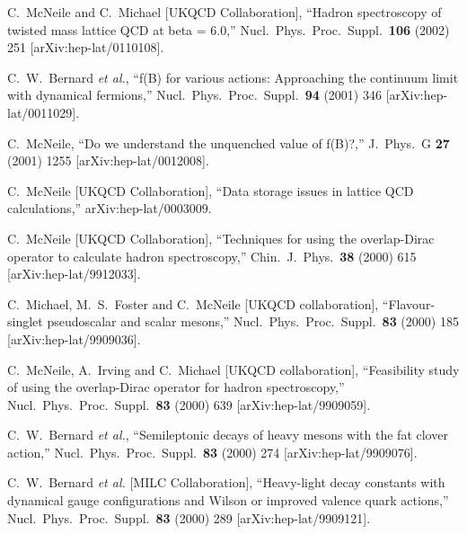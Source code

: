 \begin{thebibliography}{130}
C.~McNeile and C.~Michael  [UKQCD Collaboration],
``Hadron spectroscopy of twisted mass lattice QCD at beta = 6.0,''
Nucl.\ Phys.\ Proc.\ Suppl.\  {\bf 106} (2002) 251
[arXiv:hep-lat/0110108].


C.~W.~Bernard {\it et al.},
``f(B) for various actions: Approaching the continuum limit with  dynamical fermions,''
Nucl.\ Phys.\ Proc.\ Suppl.\  {\bf 94} (2001) 346
[arXiv:hep-lat/0011029].


C.~McNeile,
``Do we understand the unquenched value of f(B)?,''
J.\ Phys.\ G {\bf 27} (2001) 1255
[arXiv:hep-lat/0012008].


C.~McNeile  [UKQCD Collaboration],
``Data storage issues in lattice QCD calculations,''
arXiv:hep-lat/0003009.

C.~McNeile  [UKQCD Collaboration],
``Techniques for using the overlap-Dirac operator to calculate hadron  spectroscopy,''
Chin.\ J.\ Phys.\  {\bf 38} (2000) 615
[arXiv:hep-lat/9912033].

C.~Michael, M.~S.~Foster and C.~McNeile  [UKQCD collaboration],
``Flavour-singlet pseudoscalar and scalar mesons,''
Nucl.\ Phys.\ Proc.\ Suppl.\  {\bf 83} (2000) 185
[arXiv:hep-lat/9909036].

C.~McNeile, A.~Irving and C.~Michael  [UKQCD collaboration],
``Feasibility study of using the overlap-Dirac operator for hadron  spectroscopy,''
Nucl.\ Phys.\ Proc.\ Suppl.\  {\bf 83} (2000) 639
[arXiv:hep-lat/9909059].

C.~W.~Bernard {\it et al.},
``Semileptonic decays of heavy mesons with the fat clover action,''
Nucl.\ Phys.\ Proc.\ Suppl.\  {\bf 83} (2000) 274
[arXiv:hep-lat/9909076].

C.~W.~Bernard {\it et al.}  [MILC Collaboration],
``Heavy-light decay constants with dynamical gauge configurations and  Wilson or improved valence quark actions,''
Nucl.\ Phys.\ Proc.\ Suppl.\  {\bf 83} (2000) 289
[arXiv:hep-lat/9909121].


\end{thebibliography}
